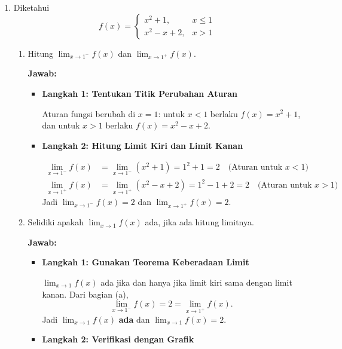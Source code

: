 \documentclass[10pt,a4paper]{article}
\newcounter{eqblock}
\newcommand{\reseteq}{%
  \stepcounter{eqblock}%
  \setcounter{equation}{0}%
  \renewcommand{\theHequation}{\arabic{eqblock}.\arabic{equation}}%
}
\begin{document}
\begin{enumerate}
\item Diketahui
\[
f(x) =
\begin{cases}
  x^2 + 1, & x \le 1 \\
  x^2 - x + 2, & x > 1
\end{cases}
\]
\begin{enumerate}

\item Hitung $\displaystyle\lim_{x \to 1^-} f(x)$ dan $\displaystyle\lim_{x \to 1^+} f(x)$.

\textbf{Jawab:}
\begin{itemize}
\item \textbf{Langkah 1: Tentukan Titik Perubahan Aturan}

Aturan fungsi berubah di $x = 1$: untuk $x < 1$ berlaku $f(x) = x^2 + 1$, dan untuk $x > 1$ berlaku $f(x) = x^2 - x + 2$.

\item \textbf{Langkah 2: Hitung Limit Kiri dan Limit Kanan}

\reseteq
\begin{align}
\lim_{x \to 1^-} f(x) &= \lim_{x \to 1^-} (x^2 + 1) = 1^2 + 1 = 2 \quad \text{(Aturan untuk $x < 1$)} \\
\lim_{x \to 1^+} f(x) &= \lim_{x \to 1^+} (x^2 - x + 2) = 1^2 - 1 + 2 = 2 \quad \text{(Aturan untuk $x > 1$)}
\end{align}
Jadi $\displaystyle\lim_{x \to 1^-} f(x) = 2$ dan $\displaystyle\lim_{x \to 1^+} f(x) = 2$.
\end{itemize}

\item Selidiki apakah $\displaystyle\lim_{x \to 1} f(x)$ ada, jika ada hitung limitnya.

\textbf{Jawab:}
\begin{itemize}
\item \textbf{Langkah 1: Gunakan Teorema Keberadaan Limit}

$\displaystyle\lim_{x \to 1} f(x)$ ada jika dan hanya jika limit kiri sama dengan limit kanan. Dari bagian (a),
\[
\lim_{x \to 1^-} f(x) = 2 = \lim_{x \to 1^+} f(x).
\]
Jadi $\displaystyle\lim_{x \to 1} f(x)$ \textbf{ada} dan $\displaystyle\lim_{x \to 1} f(x) = 2$.

\item \textbf{Langkah 2: Verifikasi dengan Grafik}


\end{itemize}
\end{enumerate}
\end{enumerate}
\end{document}
